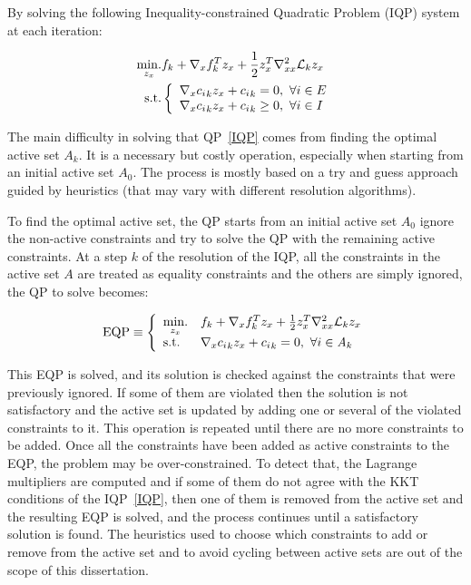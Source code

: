 By solving the following Inequality-constrained Quadratic Problem (IQP) system at each iteration:

\begin{equation}
\label{IQP}
  \begin{aligned}
    \operatorname*{min.}\limits_{z_x} &f_k + \nabla_x f_k ^T z_x + \frac{1}{2} z_x^T\nabla_{xx}^2\mathcal{L}_k z_x \\
    \text{s.t.} &
  \left\{
  \begin{array}{l}
    \nabla_x {c_i}_k z_x + {c_i}_k = 0 ,\ \forall i\in E\\
    \nabla_x {c_i}_k z_x + {c_i}_k \geq 0 ,\ \forall i\in I\\
  \end{array}
  \right.
  \end{aligned}
\end{equation}

The main difficulty in solving that QP~\ref{IQP} comes from finding the optimal active set $\mathit{A}_k$.
It is a necessary but costly operation, especially when starting from an initial active set $\mathit{A}_0$.
The process is mostly based on a try and guess approach guided by heuristics (that may vary with different resolution algorithms).

To find the optimal active set, the QP starts from an initial active set $\mathit{A}_0$ ignore the non-active constraints and try to solve the QP with the remaining active constraints.
At a step $k$ of the resolution of the IQP, all the constraints in the active set $\mathit{A}$ are treated as equality constraints and the others are simply ignored, the QP to solve becomes:

\begin{equation}
  \text{EQP} \equiv \left\{
  \begin{array}{ll}
    \operatorname*{min.}\limits_{z_x} &f_k + \nabla_x f_k ^T z_x + \frac{1}{2} z_x^T\nabla_{xx}^2\mathcal{L}_k z_x \\
    \text{s.t.} & \nabla_x {c_i}_k z_x + {c_i}_k = 0 ,\ \forall i\in \mathit{A}_k\\
  \end{array}
  \right.
\end{equation}

This EQP is solved, and its solution is checked against the constraints that were previously ignored.
If some of them are violated then the solution is not satisfactory and the active set is updated by adding one or several of the violated constraints to it.
This operation is repeated until there are no more constraints to be added.
Once all the constraints have been added as active constraints to the EQP, the problem may be over-constrained.
To detect that, the Lagrange multipliers are computed and if some of them do not agree with the KKT conditions of the IQP~\ref{IQP}, then one of them is removed from the active set and the resulting EQP is solved, and the process continues until a satisfactory solution is found.
The heuristics used to choose which constraints to add or remove from the active set and to avoid cycling between active sets are out of the scope of this dissertation.


